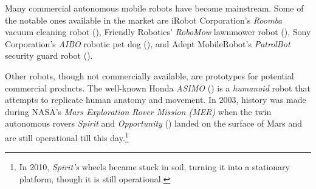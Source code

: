 




Many commercial autonomous mobile robots have become mainstream. Some of the notable ones available in the market are iRobot Corporation's \textit{Roomba} vacuum cleaning robot (), Friendly Robotics' \textit{RoboMow} lawnmower robot (), Sony Corporation's \textit{AIBO} robotic pet dog (), and Adept MobileRobot's \textit{PatrolBot} security guard robot ().  

Other robots, though not commercially available, are prototypes for potential commercial products.  The well-known Honda \textit{ASIMO} () is a \textit{humanoid} robot that attempts to replicate human anatomy and movement. In 2003, history was made during NASA's \textit{Mars Exploration Rover Mission (MER)} when the twin autonomous rovers \textit{Spirit} and \textit{Opportunity} () landed on the surface of Mars and are still operational till this day.\footnote{In 2010, \textit{Spirit's} wheels became stuck in soil, turning it into a stationary platform, though it is still operational.}


